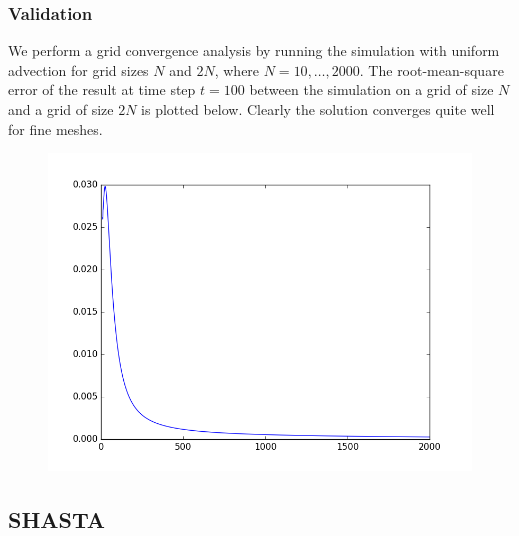 \documentclass[12pt]{article}
\begin{document}
\subsubsection{Validation}

We perform a grid convergence analysis by running the simulation with uniform advection for grid sizes $N$ and $2N$, where $N = 10, \dots, 2000$. The root-mean-square error of the result at time step $t = 100$ between the simulation on a grid of size $N$ and a grid of size $2N$ is plotted below.
Clearly the solution converges quite well for fine meshes.
\begin{figure}[H]
\begin{center}
\includegraphics[width = .85\hsize]{upwind_convergence.png}
\end{center}
\end{figure}

\subsection{SHASTA}
\end{document}
